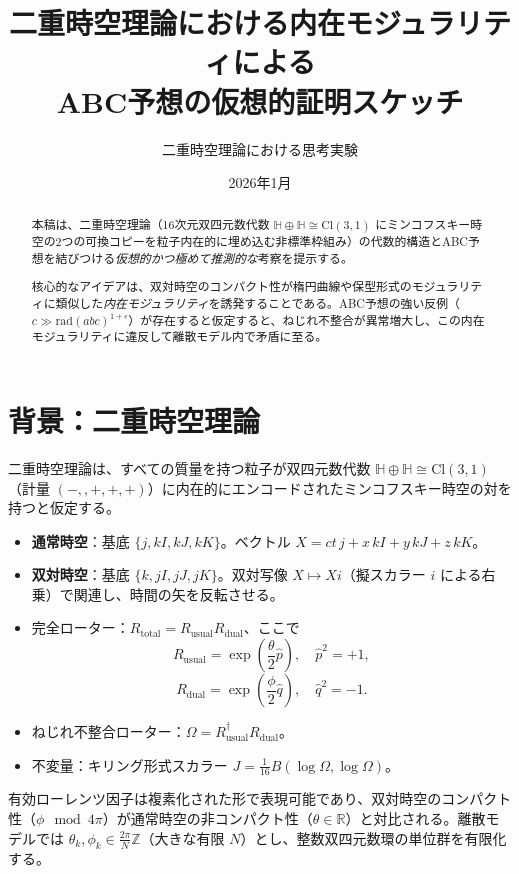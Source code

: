 \documentclass[a4paper]{article}
\title{二重時空理論における内在モジュラリティによる\\ABC予想の仮想的証明スケッチ}
\author{二重時空理論における思考実験}
\date{2026年1月}
\begin{document}

\maketitle

\begin{abstract}
本稿は、二重時空理論（16次元双四元数代数 $\mathbb{H} \oplus \mathbb{H} \cong \mathrm{Cl}(3,1)$ にミンコフスキー時空の2つの可換コピーを粒子内在的に埋め込む非標準枠組み）の代数的構造とABC予想を結びつける\emph{仮想的かつ極めて推測的な}考察を提示する。

核心的なアイデアは、双対時空のコンパクト性が楕円曲線や保型形式のモジュラリティに類似した\emph{内在モジュラリティ}を誘発することである。ABC予想の強い反例（$c \gg \mathrm{rad}(abc)^{1+\epsilon}$）が存在すると仮定すると、ねじれ不整合が異常増大し、この内在モジュラリティに違反して離散モデル内で矛盾に至る。
\end{abstract}

\section{背景：二重時空理論}

二重時空理論は、すべての質量を持つ粒子が双四元数代数 $\mathbb{H} \oplus \mathbb{H} \cong \mathrm{Cl}(3,1)$（計量 $(-,,+,+,+)$）に内在的にエンコードされたミンコフスキー時空の対を持つと仮定する。

\begin{itemize}
  \item \textbf{通常時空}：基底 $\{j, kI, kJ, kK\}$。ベクトル $X = ct\, j + x\, kI + y\, kJ + z\, kK$。
  \item \textbf{双対時空}：基底 $\{k, jI, jJ, jK\}$。双対写像 $X \mapsto Xi$（擬スカラー $i$ による右乗）で関連し、時間の矢を反転させる。
  \item 完全ローター：$R_\text{total} = R_\text{usual} R_\text{dual}$、ここで
  \[
  R_\text{usual} = \exp\!\left(\frac{\theta}{2} \hat{p}\right), \quad \hat{p}^2 = +1,
  \]
  \[
  R_\text{dual} = \exp\!\left(\frac{\phi}{2} \hat{q}\right), \quad \hat{q}^2 = -1.
  \]
  \item ねじれ不整合ローター：$\Omega = R_\text{usual}^\dagger R_\text{dual}$。
  \item 不変量：キリング形式スカラー $J = \frac{1}{16} B(\log \Omega, \log \Omega)$。
\end{itemize}

有効ローレンツ因子は複素化された形で表現可能であり、双対時空のコンパクト性（$\phi \mod 4\pi$）が通常時空の非コンパクト性（$\theta \in \mathbb{R}$）と対比される。離散モデルでは $\theta_k, \phi_k \in \frac{2\pi}{N} \mathbb{Z}$（大きな有限 $N$）とし、整数双四元数環の単位群を有限化する。
\end{document}
